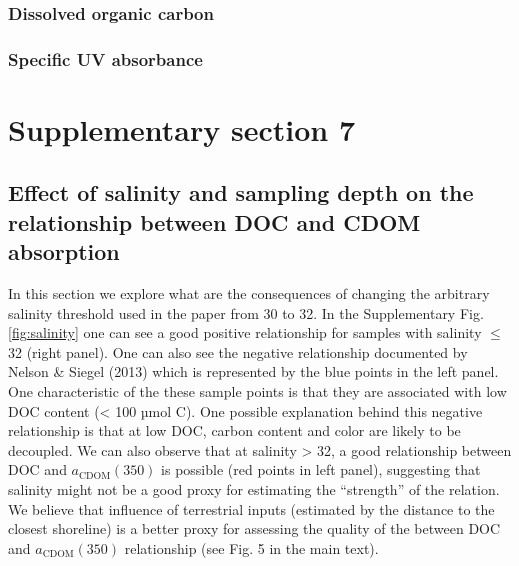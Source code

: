 \documentclass[12pt,a4paper]{scrartcl}
\begin{document}



\clearpage
\newpage

\subsubsection*{Dissolved organic carbon}



\clearpage
\newpage

\subsubsection*{Specific UV absorbance}



\clearpage
\newpage

\section*{Supplementary section 7}
\subsection*{Effect of salinity and sampling depth on the relationship between DOC and CDOM absorption}

In this section we explore what are the consequences of changing the arbitrary salinity threshold used in the paper from 30 to 32. In the Supplementary Fig. \ref{fig:salinity} one can see a good positive relationship for samples with salinity $\le$ 32 (right panel). One can also see the negative relationship documented by Nelson \& Siegel (2013) which is represented by the blue points in the left panel. One characteristic of the these sample points is that they are associated with low DOC content (< 100 µmol C). One possible explanation behind this negative relationship is that at low DOC, carbon content and color are likely to be decoupled. We can also observe that at salinity > 32, a good relationship between DOC and $a_{\text{CDOM}}(350)$ is possible (red points in left panel), suggesting that salinity might not be a good proxy for estimating the ``strength'' of the relation. We believe that influence of terrestrial inputs (estimated by the distance to the closest shoreline) is a better proxy for assessing the quality of the between DOC and $a_{\text{CDOM}}(350)$ relationship (see Fig. 5 in the main text).
\end{document}
